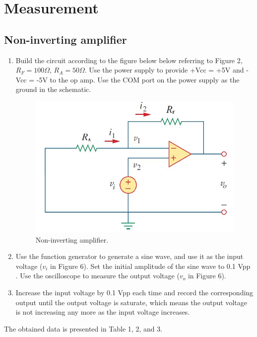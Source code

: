 \documentclass[a4paper]{report}
\begin{document}
	\section{Measurement}
	\subsection{Non-inverting amplifier}
	\begin{enumerate}[1.]
		\item Build the circuit according to the figure below below referring to Figure 2, $R_F=100\Omega$, $R_A=50\Omega$. Use the power supply to provide +Vcc = +5V and -Vcc = -5V to the op amp. Use the COM port on the power supply as the ground in the schematic.
		\begin{figure}[H]
			\centering
			\includegraphics[width=1\linewidth]{6.jpg}
			\caption{Non-inverting amplifier.}
		\end{figure}
		\item Use the function generator to generate a sine wave, and use it as the input voltage ($v_i$ in Figure 6). Set the initial amplitude of the sine wave to 0.1 Vpp . Use the oscilloscope to measure the output voltage ($v_o$ in Figure 6).
		\item Increase the input voltage by 0.1 Vpp each time and record the corresponding output until the output voltage is saturate, which means the output voltage is not increasing any more as the input voltage increases.
	\end{enumerate}
	The obtained data is presented in Table 1, 2, and 3.
\end{document}
